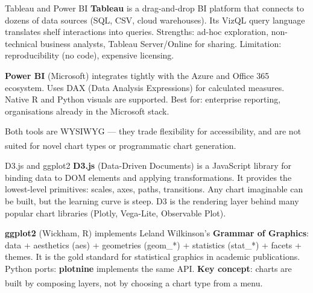 \begin{v3topic}{Tableau and Power BI}
    \textbf{Tableau} is a drag-and-drop BI platform that connects to dozens of data
    sources (SQL, CSV, cloud warehouses). Its VizQL query language translates shelf
    interactions into queries. Strengths: ad-hoc exploration, non-technical business
    analysts, Tableau Server/Online for sharing. Limitation: reproducibility (no code),
    expensive licensing.

    \textbf{Power BI} (Microsoft) integrates tightly with the Azure and Office 365
    ecosystem. Uses DAX (Data Analysis Expressions) for calculated measures. Native
    R and Python visuals are supported. Best for: enterprise reporting, organisations
    already in the Microsoft stack.

    Both tools are WYSIWYG --- they trade flexibility for accessibility, and are not
    suited for novel chart types or programmatic chart generation\textsuperscript{\cite[][pp.~1--30]{jansenHandbuchInfografik1999}}.

\end{v3topic}
\begin{v3topic}{D3.js and ggplot2}
    \textbf{D3.js} (Data-Driven Documents) is a JavaScript library for binding data to
    DOM elements and applying transformations. It provides the lowest-level primitives:
    scales, axes, paths, transitions. Any chart imaginable can be built, but the learning
    curve is steep. D3 is the rendering layer behind many popular chart libraries
    (Plotly, Vega-Lite, Observable Plot).

    \textbf{ggplot2} (Wickham, R) implements Leland Wilkinson's \textbf{Grammar of
    Graphics}: data + aesthetics (aes) + geometries (geom\_*) + statistics (stat\_*)
    + facets + themes. It is the gold standard for statistical graphics in academic
    publications. Python ports: \textbf{plotnine} implements the same API.
    \textbf{Key concept}: charts are built by composing layers, not by choosing a chart
    type from a menu\textsuperscript{\cite[][pp.~18--30]{loducaDataStorytellingAltair2024}}.
\end{v3topic}

%
